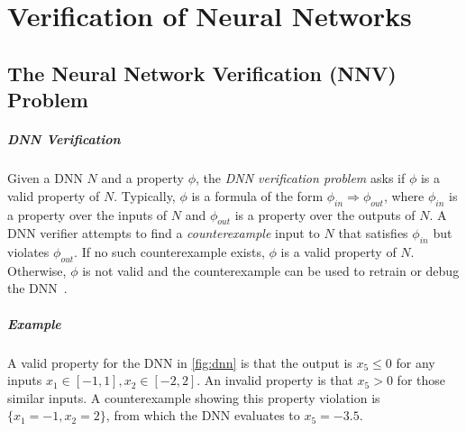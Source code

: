 \chapter{Verification of Neural Networks}\label{sec:verification}


\section{The Neural Network Verification (NNV) Problem}\label{sec:nnv-problem}
\paragraph{DNN Verification} Given a DNN \(N\) and a property $\phi$, the \emph{DNN verification problem} asks if $\phi$ is a valid property of $N$.
Typically, $\phi$ is a formula of the form $\phi_{in} \Rightarrow \phi_{out}$, where $\phi_{in}$ is a property over the inputs of $N$ and $\phi_{out}$ is a property over the outputs of $N$.
A DNN verifier attempts to find a \emph{counterexample} input to $N$ that satisfies $\phi_{in}$ but violates $\phi_{out}$.  If no such counterexample exists, $\phi$ is a valid property of $N$. Otherwise, $\phi$ is not valid and the counterexample can be used to retrain or debug the DNN~\cite{huang2017safety}.









\paragraph{Example} A valid property for the DNN in \autoref{fig:dnn} is that the output is $x_5 \le 0$ for any inputs $x_1 \in [-1,1], x_2\in[-2,2]$. An invalid property is that $x_5 > 0$ for those similar inputs.
A counterexample showing this property violation is $\{x_1=-1, x_2=2\}$, from which the DNN evaluates to $x_5=-3.5$. 

